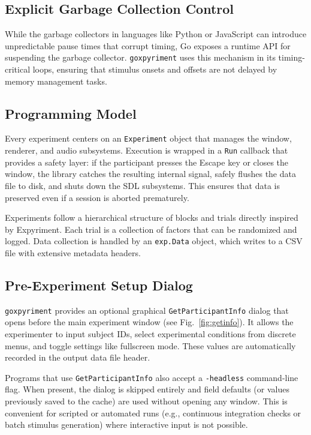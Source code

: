 \documentclass[jou,a4paper]{apa7}
\begin{document}
\subsection{Explicit Garbage Collection Control}\label{explicit-gc-control}

While the garbage collectors in languages like Python or JavaScript can
introduce unpredictable pause times that corrupt timing, Go exposes a runtime
API for suspending the garbage collector. \texttt{goxpyriment} uses this
mechanism in its timing-critical loops, ensuring that stimulus onsets and
offsets are not delayed by memory management tasks.

\subsection{Programming Model}\label{programming-model}

Every experiment centers on an \texttt{Experiment} object that manages the
window, renderer, and audio subsystems. Execution is wrapped in a
\texttt{Run} callback that provides a safety layer: if the participant presses
the Escape key or closes the window, the library catches the resulting internal
signal, safely flushes the data file to disk, and shuts down the SDL
subsystems. This ensures that data is preserved even if a session is aborted
prematurely.

Experiments follow a hierarchical structure of blocks and trials
directly inspired by Expyriment. Each trial is a
collection of factors that can be randomized and logged. Data
collection is handled by an \texttt{exp.Data} object, which writes to
a CSV file with extensive metadata headers.

\subsection{Pre-Experiment Setup Dialog}\label{setup-dialog}

\texttt{goxpyriment} provides an optional graphical
\texttt{GetParticipantInfo} dialog that opens before the main experiment
window (see Fig.~\ref{fig:getinfo}). It allows the experimenter to input subject
IDs, select experimental conditions from discrete menus, and toggle
settings like fullscreen mode. These values are automatically
recorded in the output data file header.

Programs that use \texttt{GetParticipantInfo} also accept a
\texttt{-headless} command-line flag. When present, the dialog is skipped
entirely and field defaults (or values previously saved to the cache) are
used without opening any window. This is convenient for scripted or
automated runs (e.g., continuous integration checks or batch stimulus
generation) where interactive input is not possible.
\end{document}
